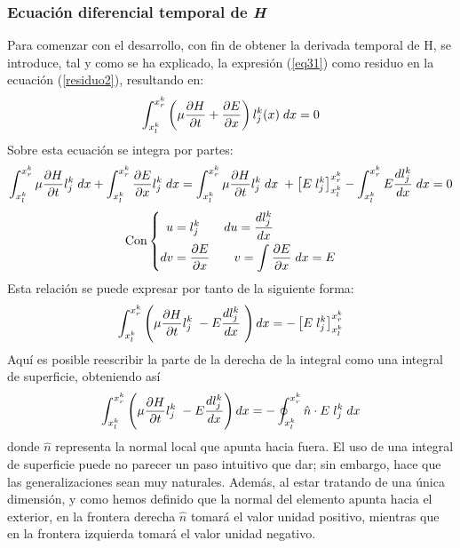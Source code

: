 \documentclass[11pt,a4paper,twoside,pdf]{article}
\numberwithin{equation}{section}
\begin{document}
\subsubsection{Ecuación diferencial temporal de \textit{H}}
Para comenzar con el desarrollo, con fin de obtener la derivada temporal de H, se introduce, tal y como se ha explicado, la expresión (\ref{eq31}) como residuo en la ecuación (\ref{residuo2}), resultando en:
\begin{equation}
    \int^{x^k_r}_{x^k_l}\left(\mu\frac{\partial H}{\partial t}+\frac{\partial E}{\partial x}\right)l_j^k(x)\;dx=0 \notag
\end{equation}
Sobre esta ecuación se integra por partes:
\begin{align}
    \int^{x^k_r}_{x^k_l}\mu\frac{\partial H}{\partial t}l_j^k\;dx 
    + \int^{x^k_r}_{x^k_l}\frac{\partial E}{\partial x} l_j^k\;dx 
    = \int^{x^k_r}_{x^k_l}\mu\frac{\partial H}{\partial t}l_j^k\;dx \notag
    \; + \left[E\;l_j^k\right]^{x^k_r}_{x^k_l}
    - \int^{x^k_r}_{x^k_l}E\frac{dl_j^k}{dx}\;dx = 0 \notag
\end{align}
\begin{equation}
        \text{Con}
\left\{
\begin{aligned}
u &= l_j^k \;\;\;\;\;\;\; du=\frac{dl_j^k}{dx} \\
dv &= \frac{\partial E}{\partial x}\;\;\;\;\;\;\; v=\int\frac{\partial E}{\partial x}\;dx=E
\end{aligned}
\right. \notag
\end{equation}
Esta relación se puede expresar por tanto de la siguiente forma:
\begin{equation}
\int^{x^k_r}_{x^k_l}\left(\mu\frac{\partial H}{\partial t}l_j^k\;-E\frac{dl_j^k}{dx}\;\right)dx=-\left[E\;l_j^k\right]^{x^k_r}_{x^k_l}
    \notag
\end{equation}
Aquí es posible reescribir la parte de la derecha de la integral como una integral de superficie, obteniendo así
\begin{equation}
 \int^{x^k_r}_{x^k_l}\left(\mu\frac{\partial H}{\partial t}l_j^k\;-E\frac{dl_j^k}{dx}\right)dx=-\oint^{x^k_r}_{x^k_l}\hat{n}\cdot E\;l_j^k\;dx
    \notag   
\end{equation}
donde $\hat{n}$ representa la normal local que apunta hacia fuera. El uso de una integral de superficie puede no parecer un paso intuitivo que dar; sin embargo, hace que las generalizaciones sean muy naturales. Además, al estar tratando de una única dimensión, y como hemos definido que la normal del elemento apunta hacia el exterior, en la frontera derecha $\hat{n}$ tomará el valor unidad positivo, mientras que en la frontera izquierda tomará el valor unidad negativo.
\end{document}
